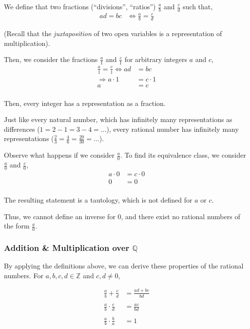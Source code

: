 \documentclass[letterpaper,twoside]{article}
\begin{document}
\begin{multicols}{2}
We define that two fractions (``divisions'', ``ratios'') $\frac{a}{b}$ and $\frac{c}{d}$ such that,
\begin{align}
    ad = bc &\Longleftrightarrow \frac{a}{b} = \frac{c}{d}
\end{align}

(Recall that the \textit{juxtaposition} of two open variables is a representation of multiplication).

Then, we consider the fractions $\frac{a}{1}$ and $\frac{c}{1}$ for arbitrary integers $a$ and $c$,
\begin{align*}
    \frac{a}{1} = \frac{c}{1} \Longleftrightarrow ad &= bc\\
    \Longrightarrow a\cdot 1 &= c\cdot 1\\
    a &= c\\
\end{align*}

Then, every integer has a representation as a fraction.

Just like every natural number, which has infinitely many representations as differences ($1 = 2 - 1 = 3 - 4 = \ldots$), every rational number has infinitely many representations ($\frac{2}{3} = \frac{4}{6} = \frac{20}{30} = \ldots$).

Observe what happens if we consider $\frac{a}{0}$.
To find its equivalence class, we consider $\frac{a}{0}$ and $\frac{c}{0}$,
\begin{align*}
    a\cdot 0 &= c \cdot 0\\
    0 &= 0\\
\end{align*}

The resulting statement is a tautology, which is not defined for $a$ or $c$.

Thus, we cannot define an inverse for 0, and there exist no rational numbers of the form $\frac{a}{0}$.

\subsubsection{Addition \& Multiplication over $\mathbb{Q}$}

By applying the definitions above, we can derive these properties of the rational numbers.
For $a,b,c,d \in \mathbb{Z}$ and $c,d \neq 0$,

\begin{align*}
    \frac{a}{b}+\frac{c}{d} &= \frac{ad+bc}{bd}\\
    \\
    \frac{a}{b}\cdot \frac{c}{d} &= \frac{ac}{bd}\\
    \\
    \frac{a}{b}\cdot \frac{b}{a} &= 1
\end{align*}


\end{multicols}
\end{document}
